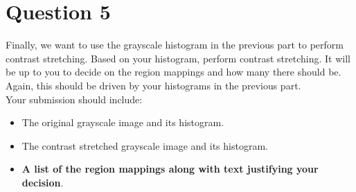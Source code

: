 \documentclass{article}
\begin{document}
\section*{Question 5}
Finally, we want to use the grayscale histogram in the previous part to perform contrast stretching.   Based on your histogram, perform contrast stretching.  It will be up to you to decide on the region mappings and how many there should be.  Again, this should be driven by your histograms in the previous part.\\

\noindent
Your submission should include:
\begin{itemize}
\item The original grayscale image and its histogram.
\item The contrast stretched grayscale image and its histogram.
\item \textbf{A list of the region mappings along with text justifying your decision}.
\end{itemize}
\end{document}
